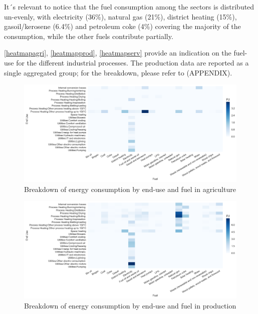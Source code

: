 \documentclass[review]{elsarticle}
\begin{document}
It´s relevant to notice that the fuel consumption among the sectors is distributed un-evenly, with electricity (36\%), natural gas (21\%), district heating (15\%), gasoil/kerosene (6.4\%) and petroleum coke (4\%) covering the majority of the consumption, while the other fuels contribute partially.


\iffalse
\autoref{heatmapagri}, \autoref{heatmapprod}, \autoref{heatmapserv} provide an indication on the fuel-use for the different industrial processes. The production data are reported as a single aggregated group; for the breakdown, please refer to (APPENDIX). 

\begin{figure}[H]
\centering
\includegraphics[width=\linewidth]{Img/dan_ind/heatmap_agri.png}
\caption{Breakdown of energy consumption by end-use and fuel in agriculture\cite{VM2015}}
\label{heatmapagri} 
\end{figure}

\begin{figure}[H]
\centering
\includegraphics[width=\linewidth]{Img/dan_ind/heatmap_prod.png}
\caption{Breakdown of energy consumption by end-use and fuel in production\cite{VM2015}}
\label{heatmapprod} 
\end{figure}
\end{document}
